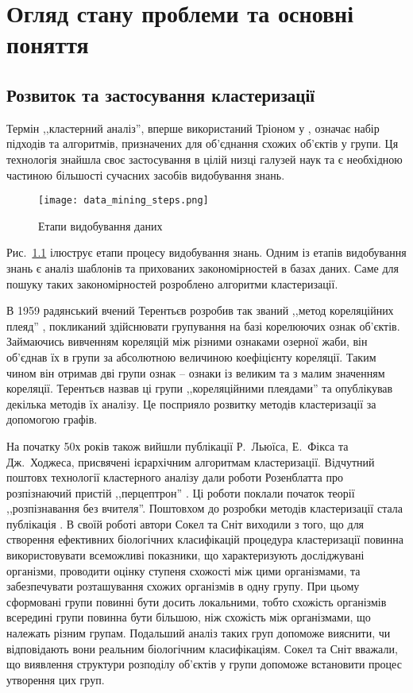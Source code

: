 \chapter{Огляд стану проблеми та основні поняття}\label{ch:01}

\section{Розвиток та застосування кластеризації}
    Термін ,,кластерний аналіз'', вперше використаний Тріоном у \cite{Tryon:Cluster:1939}, означає набір підходів та алгоритмів, призначених для об'єднання схожих об'єктів у групи. Ця технологія знайшла своє застосування в цілій низці галузей наук та є необхідною частиною більшості сучасних засобів видобування знань.
   
    \begin{figure}
        \centering
        \texttt{[image: data\_mining\_steps.png]}
        \caption{Етапи видобування даних}\label{fig:data_mining_steps}
    \end{figure}
    
    Рис.~\ref{fig:data_mining_steps} ілюструє етапи процесу видобування знань. Одним із етапів видобування знань є аналіз шаблонів та прихованих закономірностей в базах даних. Саме для пошуку таких закономірностей розроблено алгоритми кластеризації.
 
    В 1959 радянський вчений Терентьєв розробив так званий ,,метод кореляційних плеяд'' \cite{Terentyev}, покликаний здійснювати групування на базі корелюючих ознак об'єктів. Займаючись вивченням кореляцій між різними ознаками озерної жаби, він об'єднав їх в групи за абсолютною величиною коефіцієнту кореляції. Таким чином він отримав дві групи ознак -- ознаки із великим та з малим значенням кореляції. Терентьєв назвав ці групи ,,кореляційними плеядами'' та опублікував декілька методів їх аналізу. Це посприяло розвитку методів кластеризації за допомогою графів.
    
    На початку 50х років також вийшли публікації Р.~Льюїса, Е.~Фікса та Дж.~Ходжеса, присвячені ієрархічним алгоритмам кластеризації. Відчутний поштовх технології кластерного аналізу дали роботи Розенблатта про розпізнаючий пристій ,,перцептрон'' \cite{Rosenblatt}. Ці роботи поклали початок теорії ,,розпізнавання без вчителя''. Поштовхом до розробки методів кластеризації стала публікація \cite{SokalSneath}. В своїй роботі автори Сокел та Сніт виходили з того, що для створення ефективних біологічних класифікацій процедура кластеризації повинна використовувати всеможливі показники, що характеризують досліджувані організми, проводити оцінку ступеня схожості між цими організмами, та забезпечувати розташування схожих організмів в одну групу. При цьому сформовані групи повинні бути досить локальними, тобто схожість організмів всередині групи повинна бути більшою, ніж схожість між організмами, що належать різним групам. Подальший аналіз таких груп допоможе вияснити, чи відповідають вони реальним біологічним класифікаціям. Сокел та Сніт вважали, що виявлення структури розподілу об'єктів у групи допоможе встановити процес утворення цих груп.
    
